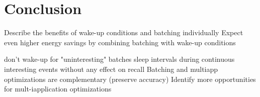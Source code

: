 \section{Conclusion}
\label{sec:conclusion}

Describe the benefits of wake-up conditions and batching individually
Expect even higher energy savings by combining batching with wake-up conditions

don't wake-up for "uninteresting" batches
sleep intervals during continuous interesting events without any effect on recall
Batching and multiapp optimizations are complementary (preserve accuracy)
Identify more opportunities for mult-iapplication optimizations


